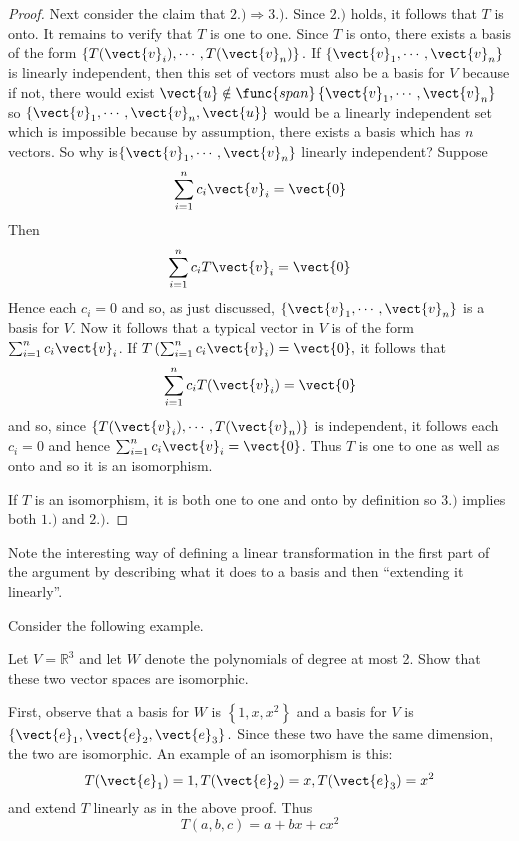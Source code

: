 \begin{proof}
Next consider the claim that $2.)\Rightarrow 3.).$ Since $2.)$ holds, it
follows that $T$ is onto. It remains to verify that $T$ is one to one. Since 
$T$ is onto, there exists a basis of the form $\left\{ T(\vect{v}_{i}),\cdots ,T
(\vect{v}_{n})\right\} .$ If $\left\{ \vect{v}_{1},\cdots ,\vect{v}_{n}\right\} $
is linearly independent, then this set of vectors must also be a basis for $
V $ because if not, there would exist $\vect{u}\notin \func{span}\left\{ \vect{
v}_{1},\cdots ,\vect{v}_{n}\right\} $ so $\left\{ \vect{v}_{1},\cdots ,\vect{v}
_{n},\vect{u}\right\} $ would be a linearly independent set which is
impossible because by assumption, there exists a basis which has $n$
vectors. So why is$\left\{ \vect{v}_{1},\cdots ,\vect{v}_{n}\right\} $
linearly independent? Suppose 
\begin{equation*}
\sum_{i=1}^{n}c_{i}\vect{v}_{i}=\vect{0}
\end{equation*}
Then
\begin{equation*}
\sum_{i=1}^{n}c_{i}T\vect{v}_{i}=\vect{0}
\end{equation*}
Hence each $c_{i}=0$ and so, as just discussed, $\left\{ \vect{v}_{1},\cdots ,
\vect{v}_{n}\right\} $ is a basis for $V$. Now it follows that a typical
vector in $V$ is of the form $\sum_{i=1}^{n}c_{i}\vect{v}_{i}$. If $T\left(
\sum_{i=1}^{n}c_{i}\vect{v}_{i}\right) =\vect{0},$ it follows that 
\begin{equation*}
\sum_{i=1}^{n}c_{i}T(\vect{v}_{i})=\vect{0}
\end{equation*}
and so, since $\left\{ T(\vect{v}_{i}),\cdots ,T(\vect{v}_{n})\right\} $ is
independent, it follows each $c_{i}=0$ and hence $\sum_{i=1}^{n}c_{i}\vect{v}
_{i}=\vect{0}$. Thus $T$ is one to one as well as onto and so it is an
isomorphism.

If $T$ is an isomorphism, it is both one to one and onto by definition so $
3.)$ implies both $1.)$ and $2.)$.
\end{proof}

Note the interesting way of defining a linear transformation in the first
part of the argument by describing what it does to a basis and then
``extending it linearly''.

Consider the following example. 

\begin{example}{}{}
Let $V=\mathbb{R}^{3}$ and let $W$ denote the polynomials of degree at most
2. Show that these two vector spaces are isomorphic.
\end{example}

\begin{solution}
First, observe that a basis for $W$ is $\left\{ 1,x,x^{2}\right\} $ and a basis for $V$
is $\left\{ \vect{e}_{1},\vect{e}_{2},\vect{e}_{3}\right\} .$ Since these two
have the same dimension, the two are
isomorphic. An example of an isomorphism is this:\ 
\begin{equation*}
T(\vect{e}_{1})=1,T(\vect{e}_{2})=x,T(\vect{e}_{3})=x^{2}
\end{equation*}
and extend $T$ linearly as in the above proof. Thus 
\begin{equation*}
T\left( a,b,c\right) =a+bx+cx^{2}
\end{equation*}
\end{solution}
